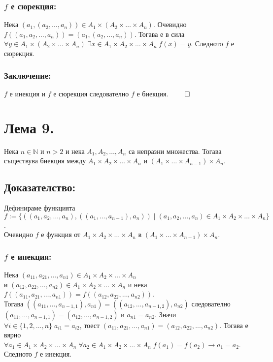 \documentclass[a4paper, 12pt, oneside]{article}
\newcommand{\N}{\mathbb{N}}
\begin{document}
\subsubsection*{\(f\) е сюрекция:}
Нека \((a_1, (a_2, \dots, a_n)) \in A_1 \times (A_2 \times \dots \times A_n)\).
Очевидно \(f((a_1, a_2, \dots, a_n)) = (a_1, (a_2, \dots, a_n))\). Тогава е в сила \\
\(\forall y \in A_1 \times (A_2 \times \dots \times A_n) \; \exists x \in A_1 \times A_2 \times \dots \times A_n \; f(x) = y\).
Следното \(f\) е сюрекция.
\subsubsection*{Заключение:}
\(f\) е инекция и \(f\) е сюрекция следователно \(f\) е биекция. \(\qed\)
\section*{Лема 9.}
Нека \(n \in \N\) и \(n > 2\) и нека 
\(A_1, A_2, \dots, A_n\) са непразни множества.
Тогава съществува биекция между \(A_1 \times A_2 \times \dots \times A_n\)
и \((A_1 \times \dots \times A_{n - 1}) \times A_n\).
\subsection*{Доказателство:}
Дефинираме функцията \\
\(f := \{((a_1, a_2, \dots, a_n), ((a_1, \dots, a_{n - 1}), a_n)) \; | \; (a_1, a_2, \dots, a_n) \in A_1 \times A_2 \times \dots \times A_n\}\). \\
Очевидно \(f\) е функция от \(A_1 \times A_2 \times \dots \times A_n\) в \((A_1 \times \dots \times A_{n - 1}) \times A_n\).
\subsubsection*{\(f\) е инекция:}
Нека \((a_{11}, a_{21}, \dots, a_{n1}) \in A_1 \times A_2 \times \dots \times A_n\) \\
и \((a_{12}, a_{22}, \dots, a_{n2}) \in A_1 \times A_2 \times \dots \times A_n\)
и нека \(f((a_{11}, a_{21}, \dots, a_{n1})) = f((a_{12}, a_{22}, \dots, a_{n2}))\). \\
Тогава \(((a_{11}, \dots, a_{n - 1,1}), a_{n1}) = ((a_{12}, \dots, a_{n - 1,2}), a_{n2})\)
следователно \((a_{11}, \dots, a_{n - 1,1}) = (a_{12}, \dots, a_{n - 1,2})\) и \(a_{n1} = a_{n2}\).
Значи \(\forall i \in \{1, 2, \dots, n\} \; a_{i1} = a_{i2}\),
тоест \((a_{11}, a_{21}, \dots, a_{n1}) = (a_{12}, a_{22}, \dots, a_{n2})\).
Тогава е вярно \\
\(\forall a_1 \in A_1 \times A_2 \times \dots \times A_n \; \forall a_2 \in A_1 \times A_2 \times \dots \times A_n \; f(a_1) = f(a_2) \longrightarrow a_1 = a_2\).
Следното \(f\) е инекция.
\end{document}
